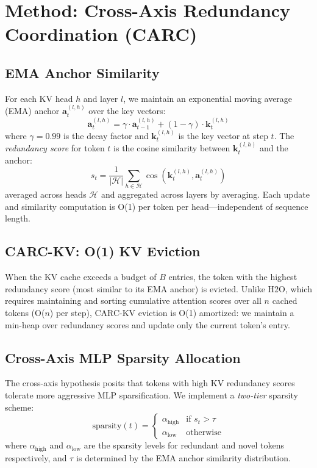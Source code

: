 \documentclass[11pt,a4paper]{article}
\begin{document}
\section{Method: Cross-Axis Redundancy Coordination (CARC)}
\label{sec:method}

\subsection{EMA Anchor Similarity}

For each KV head $h$ and layer $l$, we maintain an exponential moving average (EMA) anchor $\mathbf{a}^{(l,h)}_t$ over the key vectors:
\begin{equation}
    \mathbf{a}^{(l,h)}_t = \gamma \cdot \mathbf{a}^{(l,h)}_{t-1} + (1 - \gamma) \cdot \mathbf{k}^{(l,h)}_t
\end{equation}
where $\gamma{=}0.99$ is the decay factor and $\mathbf{k}^{(l,h)}_t$ is the key vector at step $t$.
The \emph{redundancy score} for token $t$ is the cosine similarity between $\mathbf{k}^{(l,h)}_t$ and the anchor:
\begin{equation}
    s_t = \frac{1}{|\mathcal{H}|} \sum_{h \in \mathcal{H}} \cos(\mathbf{k}^{(l,h)}_t, \mathbf{a}^{(l,h)}_t)
\end{equation}
averaged across heads $\mathcal{H}$ and aggregated across layers by averaging.
Each update and similarity computation is O(1) per token per head---independent of sequence length.

\subsection{CARC-KV: O(1) KV Eviction}

When the KV cache exceeds a budget of $B$ entries, the token with the highest redundancy score (most similar to its EMA anchor) is evicted.
Unlike H2O, which requires maintaining and sorting cumulative attention scores over all $n$ cached tokens (O($n$) per step), CARC-KV eviction is O(1) amortized: we maintain a min-heap over redundancy scores and update only the current token's entry.

\subsection{Cross-Axis MLP Sparsity Allocation}

The cross-axis hypothesis posits that tokens with high KV redundancy scores tolerate more aggressive MLP sparsification.
We implement a \emph{two-tier} sparsity scheme:
\begin{equation}
    \text{sparsity}(t) = \begin{cases}
        \alpha_{\text{high}} & \text{if } s_t > \tau \\
        \alpha_{\text{low}}  & \text{otherwise}
    \end{cases}
\end{equation}
where $\alpha_{\text{high}}$ and $\alpha_{\text{low}}$ are the sparsity levels for redundant and novel tokens respectively, and $\tau$ is determined by the EMA anchor similarity distribution.
\end{document}
